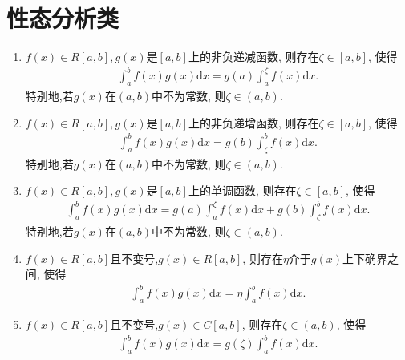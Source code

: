 \documentclass[../../main.tex]{subfiles}%
\begin{document}
\section{性态分析类}

\begin{theorem}[积分中值定理]\label{theorem:积分中值定理}
\begin{enumerate}[(1)]
\item \label{theorem:积分中值定理(1)}\(f(x)\in R[a,b],g(x)\)是\([a,b]\)上的非负递减函数, 则存在\(\zeta\in[a,b]\), 使得
\begin{align*}
\int_{a}^{b}f(x)g(x)\mathrm{d}x = g(a)\int_{a}^{\zeta}f(x)\mathrm{d}x.
\end{align*}
特别地,若\(g(x)\)在\((a,b)\)中不为常数, 则\(\zeta\in(a,b)\).

\item \label{theorem:积分中值定理(2)} \(f(x)\in R[a,b],g(x)\)是\([a,b]\)上的非负递增函数, 则存在\(\zeta\in[a,b]\), 使得
\begin{align*}
\int_{a}^{b}f(x)g(x)\mathrm{d}x = g(b)\int_{\zeta}^{b}f(x)\mathrm{d}x.
\end{align*}
特别地,若\(g(x)\)在\((a,b)\)中不为常数, 则\(\zeta\in(a,b)\).

\item \label{theorem:积分中值定理(3)}\(f(x)\in R[a,b],g(x)\)是\([a,b]\)上的单调函数, 则存在\(\zeta\in[a,b]\), 使得
\begin{align*}
\int_{a}^{b}f(x)g(x)\mathrm{d}x = g(a)\int_{a}^{\zeta}f(x)\mathrm{d}x + g(b)\int_{\zeta}^{b}f(x)\mathrm{d}x.
\end{align*}
特别地,若\(g(x)\)在\((a,b)\)中不为常数, 则\(\zeta\in(a,b)\).

\item \label{theorem:积分中值定理(4)}\(f(x)\in R[a,b]\)且不变号,\(g(x)\in R[a,b]\), 则存在\(\eta\)介于\(g(x)\)上下确界之间, 使得
\begin{align*}
\int_{a}^{b}f(x)g(x)\mathrm{d}x = \eta\int_{a}^{b}f(x)\mathrm{d}x.
\end{align*}

\item \label{theorem:积分中值定理(5)}\(f(x)\in R[a,b]\)且不变号,\(g(x)\in C[a,b]\), 则存在\(\zeta\in(a,b)\), 使得
\begin{align*}
\int_{a}^{b}f(x)g(x)\mathrm{d}x = g(\zeta)\int_{a}^{b}f(x)\mathrm{d}x.
\end{align*}
\end{enumerate}
\end{theorem}
\end{document}
